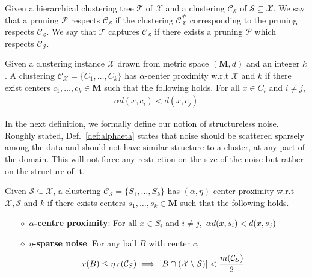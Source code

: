 \documentclass[anon,12pt]{colt2016} %
\newcommand{\mc}{\mathcal}
\newcommand{\mb}{\mathbf}
\begin{document}
\begin{definition}[$\mc T$ captures $\mc C_{\mc S}$]Given a hierarchical clustering tree $\mc T$ of $\mc X$ and a clustering $\mc C_{\mc S}$ of $\mc S \subseteq \mc X$. We say that a pruning $\mc P$ respects $\mc C_{\mc S}$ if the clustering $\mc C_{\mc X}^{\mc P}$ corresponding to the pruning respects $\mc C_{\mc S}$. We say that $\mc T$ captures $\mc C_{\mc S}$ if there exists a pruning $\mc P$ which respects $\mc C_{\mc S}$.
\end{definition}

\begin{definition}
\label{defn:alphacp}
Given a clustering instance $\mc X$ drawn from metric space $(\mb M, d)$ and an integer $k$. A clustering $\mc C_{\mc X} = \{C_1, \ldots, C_k\}$ has $\alpha$-center proximity w.r.t $\mc X$ and $k$ if there exist centers $c_1, \ldots, c_k \in \mb M$  such that the following holds. For all $x \in C_i$ and $i\neq j$, 
\vspace{-0.05in}\begin{align*}
\alpha d(x, c_i) < d(x, c_j)
\end{align*} 
\end{definition}

In the next definition, we formally define our notion of structureless noise. Roughly stated, Def.~\ref{def:alphaeta} states that noise should be scattered sparsely among the data and should not have similar structure to a cluster, at any part of the domain. This will not force any restriction on the size of the noise but rather on the structure of it.

\begin{definition}
\label{def:alphaeta}
Given $\mc S \subseteq \mc X$, a clustering $\mc C_{\mc S} = \{S_1, \ldots, S_k\}$ has $(\alpha, \eta)$-center proximity w.r.t $\mc X, \mc S$ and $k$ if there exists centers $s_1, \ldots, s_k \in \mb M$  such that the following holds.
\begin{itemize}[nolistsep, noitemsep]
\label{defn:alphacpnoise}	

\item[$\diamond$] {\bf $\alpha$-centre proximity}: For all $x \in S_i$ and $i\neq j$, $\thinspace\alpha d(x, s_i) < d(x, s_j)$
\item[$\diamond$]{\bf $\eta$-sparse noise}: For any ball $B$ with center $c$, 
\vspace{-0.1in}\begin{align*}
r(B)\leq \eta \thinspace r(\mc{C}_{\mc S}) \implies |B\cap (\mc X\setminus \mc S)| < \frac{m(\mc C_{\mc S})}{2}
\end{align*}
\end{itemize}
\end{definition}
\end{document}
